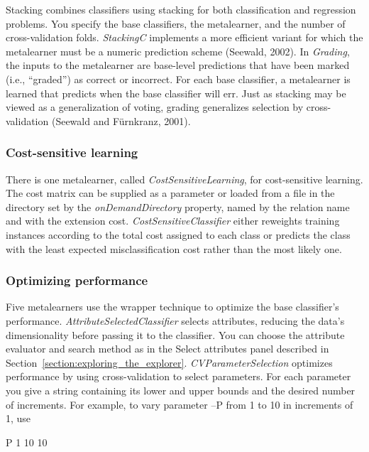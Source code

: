 Stacking combines classifiers using stacking for both classification
and regression problems. You specify the base classifiers, the
metalearner, and the number of cross-validation folds. \textit{StackingC}
implements a more efficient variant for which the metalearner must be
a numeric prediction scheme (Seewald, 2002). In \textit{Grading}, the inputs to
the metalearner are base-level predictions that have been marked
(i.e., ``graded'') as correct or incorrect. For each base classifier, a
metalearner is learned that predicts when the base classifier will
err. Just as stacking may be viewed as a generalization of voting,
grading generalizes selection by cross-validation (Seewald and
F{\"u}rnkranz, 2001).

\subsubsection{Cost-sensitive learning}

There is one metalearner, called \textit{CostSensitiveLearning}, for
cost-sensitive learning. The cost matrix can be supplied as a
parameter or loaded from a file in the directory set by the
\textit{onDemandDirectory} property, named by the relation name and
with the extension cost. \textit{CostSensitiveClassifier} either
reweights training instances according to the total cost assigned to
each class or predicts the class with the least expected
misclassification cost rather than the most likely one.

\subsubsection{Optimizing performance}

Five metalearners use the wrapper technique to optimize the base
classifier’s performance. \textit{AttributeSelectedClassifier} selects
attributes, reducing the data's dimensionality before passing it to
the classifier. You can choose the attribute evaluator and search
method as in the Select attributes panel described in
Section~\ref{section:exploring_the_explorer}. \textit{CVParameterSelection}
optimizes performance by using cross-validation to select
parameters. For each parameter you give a string containing its lower
and upper bounds and the desired number of increments. For example, to
vary parameter --P from 1 to 10 in increments of 1, use\newline

P 1 10 10\newline


